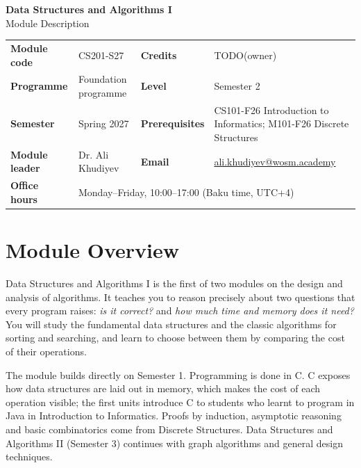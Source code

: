 \documentclass[11pt,a4paper]{article}
\makeatletter
\newcommand{\ModuleTitle}{Data Structures and Algorithms I}
\newcommand{\ModuleCode}{CS201-S27}
\newcommand{\Programme}{Foundation programme}
\newcommand{\Level}{Semester 2}
\newcommand{\Semester}{Spring 2027}
\newcommand{\Credits}{TODO(owner)}
\newcommand{\ModuleLeader}{Dr. Ali Khudiyev}
\newcommand{\Email}{ali.khudiyev@wosm.academy}
\newcommand{\OfficeHours}{Monday--Friday, 10:00--17:00 (Baku time, UTC+4)}
\newcommand{\Prerequisites}{CS101-F26 Introduction to Informatics; M101-F26 Discrete Structures}
\makeatother
\begin{document}
\begin{center}
  {\LARGE\bfseries\color{accent} \ModuleTitle}\\[4pt]
  {\large Module Description}
\end{center}
\vspace{6pt}

\begin{tabularx}{\textwidth}{>{\bfseries}l X >{\bfseries}l X}
\toprule
Module code   & \ModuleCode    & Credits      & \Credits \\
Programme     & \Programme     & Level        & \Level \\
Semester      & \Semester      & Prerequisites & \Prerequisites \\
Module leader & \ModuleLeader  & Email        & \href{mailto:\Email}{\Email} \\
Office hours  & \multicolumn{3}{l}{\OfficeHours} \\
\bottomrule
\end{tabularx}

\section{Module Overview}
Data Structures and Algorithms I is the first of two modules on the design and
analysis of algorithms. It teaches you to reason precisely about two questions that
every program raises: \emph{is it correct?} and \emph{how much time and memory does
it need?} You will study the fundamental data structures and the classic algorithms
for sorting and searching, and learn to choose between them by comparing the cost of
their operations.

The module builds directly on Semester 1. Programming is done in C. C exposes how
data structures are laid out in memory, which makes the cost of each operation
visible; the first units introduce C to students who learnt to program in Java in
Introduction to Informatics. Proofs by induction, asymptotic reasoning and basic
combinatorics come from Discrete Structures. Data Structures and Algorithms II
(Semester 3) continues with graph algorithms and general design techniques.
\end{document}
